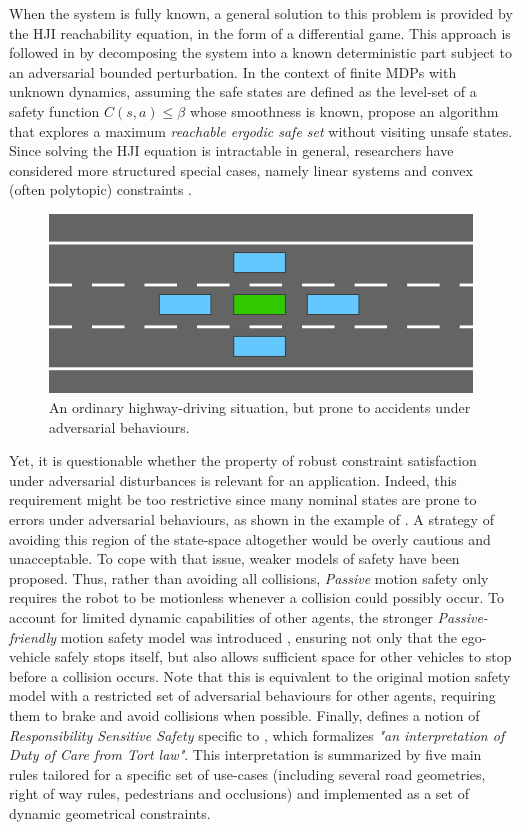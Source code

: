 When the system is fully known, a general solution to this problem is provided by the \gls{HJI} reachability equation, in the form of a differential game. This approach is followed in \citep{leung2018infusing,Fisac2019} by decomposing the system into a known deterministic part subject to an adversarial bounded perturbation. In the context of finite \acp*{MDP} with unknown dynamics, 
assuming the safe states are defined as the level-set of a safety function  $C(s,a) \leq \beta$ whose smoothness is known, \citet{Turchetta2016} propose an algorithm that explores a maximum \emph{reachable ergodic safe set} without visiting unsafe states.
Since solving the \gls{HJI} equation is intractable in general, researchers have considered more structured special cases, namely linear systems and convex (often polytopic) constraints \citep{Fukushima2007,Adetola2009,Aswani2013,Lorenzen2017,Kohler2019,Lu2019}.

\begin{figure}[ht]
	\centering
	\includegraphics[width=0.45\linewidth]{img/safety_no_2_small}
	\caption{An ordinary highway-driving situation, but prone to accidents under adversarial behaviours.}
	\label{fig:no-safety}
\end{figure}
Yet, it is questionable whether the property of robust constraint satisfaction under adversarial disturbances is relevant for an  application. Indeed, this requirement might be too restrictive since many nominal states are prone to errors under adversarial behaviours, as shown in the example of . A strategy of avoiding this region of the state-space altogether would be overly cautious and unacceptable. To cope with that issue, weaker models of safety have been proposed. Thus, rather than avoiding all collisions, \emph{Passive} motion safety \citep{Macek2009,Bouraine2012,Bouraine2014} only requires the robot to be motionless whenever a collision could possibly occur. To account for limited dynamic capabilities of other agents, the stronger \emph{Passive-friendly} motion safety model was introduced \citep{Mitsch2017}, ensuring not only that the ego-vehicle safely stops itself, but also allows sufficient space for other vehicles to stop before a collision occurs. Note that this is equivalent to the original motion safety model with a restricted set of adversarial behaviours for other agents, requiring them to brake and avoid collisions when possible. Finally, \citet{ShalevShwartz2017} defines a notion of \emph{Responsibility Sensitive Safety} specific to , which formalizes \emph{"an interpretation of \emph{Duty of Care} from Tort law"}. This interpretation is summarized by five main rules tailored for a specific set of use-cases (including several road geometries, right of way rules, pedestrians and occlusions) and implemented as a set of dynamic geometrical constraints.

